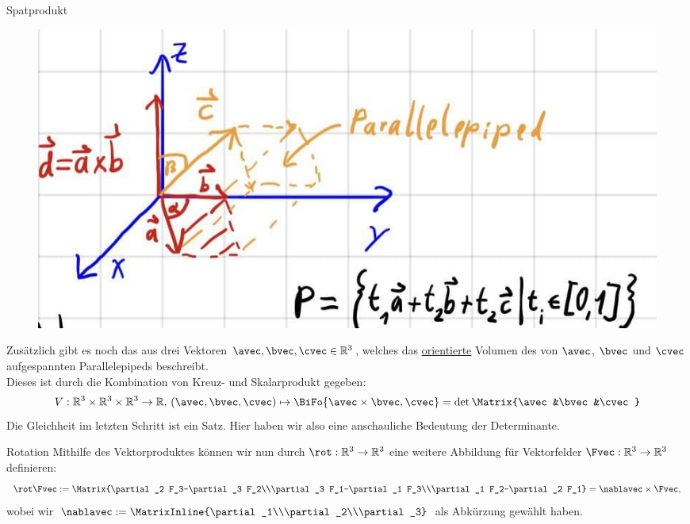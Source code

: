 \begin{Def}
{Spatprodukt}
\begin{figure}
 \vspace{-15pt}
\includegraphics[width=.35\textwidth]{Dateien/07/07Parallelepiped.jpg}
 \vspace{-15pt}
\end{figure}
Zusätzlich gibt es noch das  aus drei Vektoren $\avec,\bvec,\cvec\in\mathbb{R}^3$, welches das \underline{orientierte} Volumen des von $\avec$, $\bvec$ und $\cvec$ aufgespannten Parallelepipeds beschreibt.\\
Dieses ist durch die Kombination von Kreuz- und Skalarprodukt gegeben:
\begin{equation}
    V:\mathbb{R}^3\times\mathbb{R}^3\times\mathbb{R}^3\to\mathbb{R},\, (\avec,\bvec,\cvec)\mapsto\BiFo{\avec\times\bvec,\cvec}=\det\Matrix{\avec &\bvec &\cvec}
\end{equation}
Die Gleichheit im letzten Schritt ist ein Satz. Hier haben wir also eine anschauliche Bedeutung der Determinante.
\end{Def}
\begin{Def}
{Rotation}
Mithilfe des Vektorproduktes können wir nun durch $\rot:\mathbb{R}^3\to\mathbb{R}^3$ eine weitere Abbildung für Vektorfelder $\Fvec:\mathbb{R}^3\to\mathbb{R}^3$ definieren:
\begin{equation}
    \rot \Fvec:=\Matrix{\partial_2 F_3-\partial_3 F_2\\\partial_3 F_1-\partial_1 F_3\\\partial_1 F_2-\partial_2 F_1}=\nablavec\times \Fvec,
\end{equation}
wobei wir $\nablavec:=\MatrixInline{\partial_1\\\partial_2\\\partial_3}$ als Abkürzung gewählt haben.
\end{Def}
